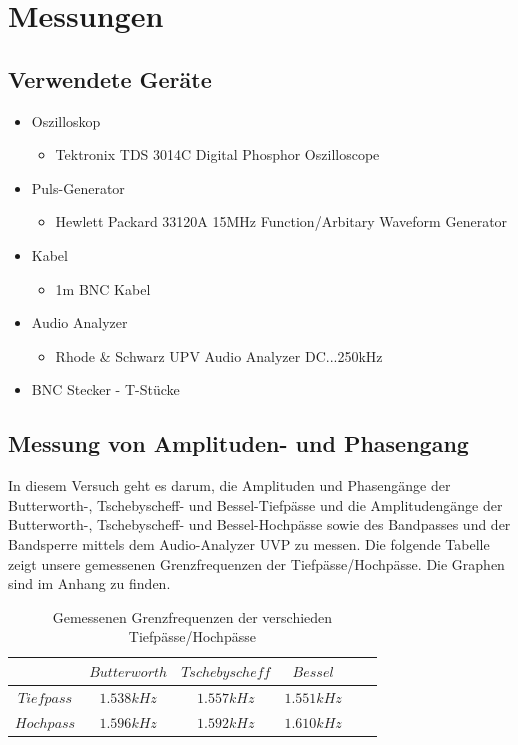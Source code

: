 \section{Messungen}
\subsection{Verwendete Geräte}

	\begin{itemize}
		\item Oszilloskop
		\begin{itemize}
			\item Tektronix TDS 3014C Digital Phosphor Oszilloscope
		\end{itemize}
		
		\item Puls-Generator
		\begin{itemize}
			\item Hewlett Packard 33120A 15MHz Function/Arbitary Waveform Generator
		\end{itemize}
		
		\item Kabel
		\begin{itemize}
			\item 1m BNC Kabel
		\end{itemize}
		
		\item Audio Analyzer
		\begin{itemize}
			\item Rhode \& Schwarz UPV Audio Analyzer DC...250kHz
		\end{itemize}
		
		\item BNC Stecker - T-Stücke
	\end{itemize}


\newpage

\subsection{Messung von Amplituden- und Phasengang}
\noindent In diesem Versuch geht es darum, die Amplituden und Phasengänge der Butterworth-, Tschebyscheff- und Bessel-Tiefpässe und die Amplitudengänge der Butterworth-, Tschebyscheff- und Bessel-Hochpässe sowie des Bandpasses und der Bandsperre mittels dem Audio-Analyzer UVP zu messen. Die folgende Tabelle zeigt unsere gemessenen Grenzfrequenzen der Tiefpässe/Hochpässe. Die Graphen sind im Anhang zu finden.

	\begin{table}[h]
		\centering
		\begin{tabular}{c|c|c|c|c|c}
			$ $        & $Butterworth$ & $Tschebyscheff$ & $Bessel$  \\
			\hline
			$Tiefpass$ & $1.538kHz$    & $1.557kHz$      & $1.551kHz$  \\
			$Hochpass$ & $1.596kHz$    & $1.592kHz$      & $1.610kHz$  \\   
		\end{tabular}
		\caption{Gemessenen Grenzfrequenzen der verschieden Tiefpässe/Hochpässe}
		\label{tab:grenzfrequnzen_hp_tp}
	\end{table}
	
